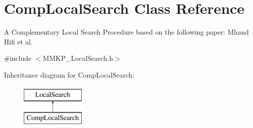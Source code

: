 \hypertarget{class_comp_local_search}{\section{Comp\+Local\+Search Class Reference}
\label{class_comp_local_search}
}


A Complementary Local Search Procedure based on the following paper\+: Mhand Hifi et al.  




{\ttfamily \#include $<$M\+M\+K\+P\+\_\+\+Local\+Search.\+h$>$}

Inheritance diagram for Comp\+Local\+Search\+:\begin{figure}[H]
\begin{center}
\leavevmode
\includegraphics[height=2.000000cm]{class_comp_local_search}
\end{center}
\end{figure}
